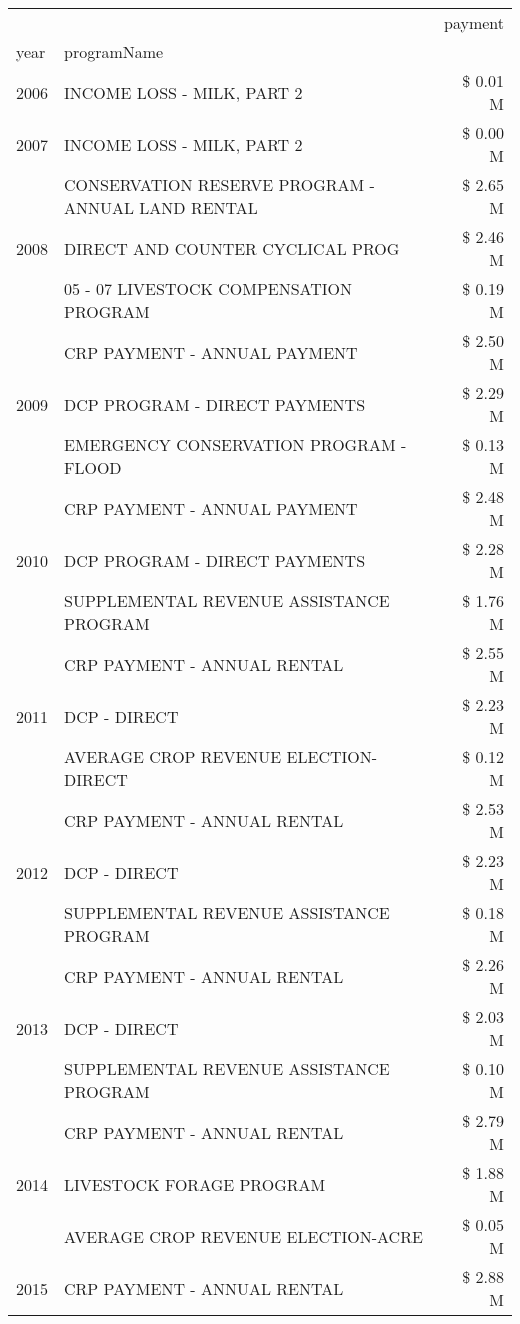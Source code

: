 \begin{tabular}{llr}
\toprule
 &  & payment \\
year & programName &  \\
\midrule
2006 & INCOME LOSS - MILK, PART 2 & \$ 0.01 M \\
\cline{1-3}
2007 & INCOME LOSS - MILK, PART 2 & \$ 0.00 M \\
\cline{1-3}
\multirow[t]{3}{*}{2008} & CONSERVATION RESERVE PROGRAM - ANNUAL LAND RENTAL & \$ 2.65 M \\
 & DIRECT AND COUNTER CYCLICAL PROG & \$ 2.46 M \\
 & 05 - 07 LIVESTOCK COMPENSATION PROGRAM & \$ 0.19 M \\
\cline{1-3}
\multirow[t]{3}{*}{2009} & CRP PAYMENT - ANNUAL PAYMENT & \$ 2.50 M \\
 & DCP PROGRAM - DIRECT PAYMENTS & \$ 2.29 M \\
 & EMERGENCY CONSERVATION PROGRAM - FLOOD & \$ 0.13 M \\
\cline{1-3}
\multirow[t]{3}{*}{2010} & CRP PAYMENT - ANNUAL PAYMENT & \$ 2.48 M \\
 & DCP PROGRAM - DIRECT PAYMENTS & \$ 2.28 M \\
 & SUPPLEMENTAL REVENUE ASSISTANCE PROGRAM & \$ 1.76 M \\
\cline{1-3}
\multirow[t]{3}{*}{2011} & CRP PAYMENT - ANNUAL RENTAL & \$ 2.55 M \\
 & DCP - DIRECT & \$ 2.23 M \\
 & AVERAGE CROP REVENUE ELECTION-DIRECT & \$ 0.12 M \\
\cline{1-3}
\multirow[t]{3}{*}{2012} & CRP PAYMENT - ANNUAL RENTAL & \$ 2.53 M \\
 & DCP - DIRECT & \$ 2.23 M \\
 & SUPPLEMENTAL REVENUE ASSISTANCE PROGRAM & \$ 0.18 M \\
\cline{1-3}
\multirow[t]{3}{*}{2013} & CRP PAYMENT - ANNUAL RENTAL & \$ 2.26 M \\
 & DCP - DIRECT & \$ 2.03 M \\
 & SUPPLEMENTAL REVENUE ASSISTANCE PROGRAM & \$ 0.10 M \\
\cline{1-3}
\multirow[t]{3}{*}{2014} & CRP PAYMENT - ANNUAL RENTAL & \$ 2.79 M \\
 & LIVESTOCK FORAGE PROGRAM & \$ 1.88 M \\
 & AVERAGE CROP REVENUE ELECTION-ACRE & \$ 0.05 M \\
\cline{1-3}
\multirow[t]{3}{*}{2015} & CRP PAYMENT - ANNUAL RENTAL & \$ 2.88 M \\

\end{tabular}
